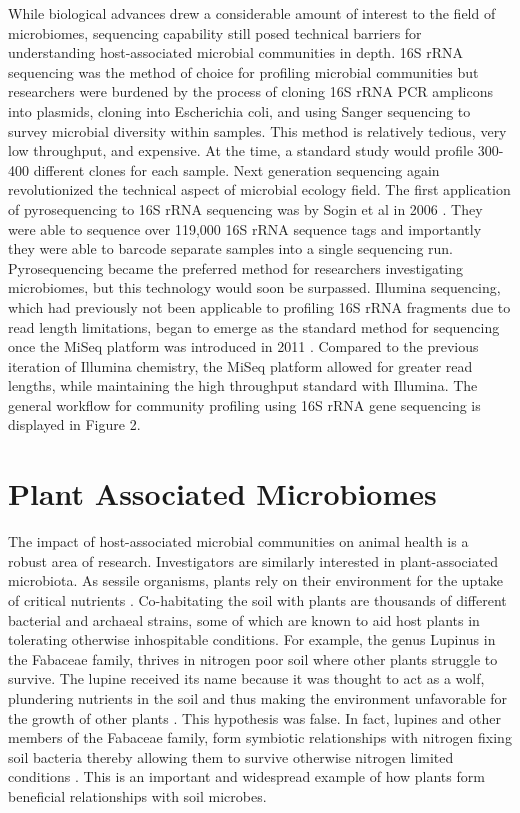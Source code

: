 While biological advances drew a considerable amount of interest to the field of microbiomes, sequencing capability still posed technical barriers for understanding host-associated microbial communities in depth. 16S rRNA sequencing was the method of choice for profiling microbial communities but researchers were burdened by the process of cloning 16S rRNA PCR amplicons into plasmids, cloning into Escherichia coli, and using Sanger sequencing to survey microbial diversity within samples. This method is relatively tedious, very low throughput, and expensive. At the time, a standard study would profile 300-400 different clones for each sample. Next generation sequencing again revolutionized the technical aspect of microbial ecology field. The first application of pyrosequencing to 16S rRNA sequencing was by Sogin et al in 2006 \cite{Sogin2006}. They were able to sequence over 119,000 16S rRNA sequence tags and importantly they were able to barcode separate samples into a single sequencing run. Pyrosequencing became the preferred method for researchers investigating microbiomes, but this technology would soon be surpassed. Illumina sequencing, which had previously not been applicable to profiling 16S rRNA fragments due to read length limitations, began to emerge as the standard method for sequencing once the MiSeq platform was introduced in 2011 \cite{Caporaso2011}. Compared to the previous iteration of Illumina chemistry, the MiSeq platform allowed for greater read lengths, while maintaining the high throughput standard with Illumina. The general workflow for community profiling using 16S rRNA gene sequencing is displayed in Figure 2.

\section{Plant Associated Microbiomes}
%
The impact of host-associated microbial communities on animal health is a robust area of research. Investigators are similarly interested in plant-associated microbiota. As sessile organisms, plants rely on their environment for the uptake of critical nutrients \cite{Epstein1971}. Co-habitating the soil with plants are thousands of different bacterial and archaeal strains, some of which are known to aid host plants in tolerating otherwise inhospitable conditions. For example, the genus Lupinus in the Fabaceae family, thrives in nitrogen poor soil where other plants struggle to survive. The lupine received its name because it was thought to act as a wolf, plundering nutrients in the soil and thus making the environment unfavorable for the growth of other plants \cite{Austin2004}. This hypothesis was false. In fact, lupines and other members of the Fabaceae family, form symbiotic relationships with nitrogen fixing soil bacteria thereby allowing them to survive otherwise nitrogen limited conditions \cite{Vance2001}. This is an important and widespread example of how plants form beneficial relationships with soil microbes.
	
